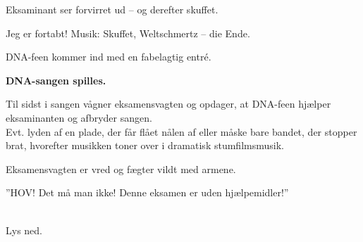 \documentclass[a4paper,12pt]{article}
\begin{document}
\begin{sketch}
\scene Eksaminant ser forvirret ud -- og derefter skuffet.

Jeg er fortabt!
Musik: Skuffet, Weltschmertz – die Ende.

\scene DNA-feen kommer ind med en fabelagtig entré.

\textbf{DNA-sangen spilles.}

\scene Til sidst i sangen vågner eksamensvagten og opdager, at DNA-feen hjælper eksaminanten og afbryder sangen.\\
Evt. lyden af en plade, der får flået nålen af eller måske bare bandet, der stopper brat, hvorefter musikken toner over i dramatisk stumfilmsmusik.

Eksamensvagten er vred og fægter vildt med armene.

”HOV! Det må man ikke! Denne eksamen er uden hjælpemidler!”

\\
Lys ned. 



%
%
%
%
%
%
%
%
%
%
%
%
%
%
%
%
%
%


\end{sketch}
\end{document}
